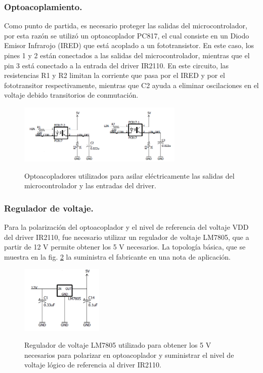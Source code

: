 \subsubsection{Optoacoplamiento.}
Como punto de partida, es necesario proteger las salidas del microcontrolador, por esta razón se utilizó un optoacoplador PC817, el cual consiste en un Diodo Emisor Infrarojo (IRED) que está acoplado a un fototransistor. En este caso, los pines 1 y 2 están conectados a las salidas del microcontrolador, mientras que el pin 3 está conectado a la entrada del driver IR2110. En este circuito, las resistencias R1 y R2 limitan la corriente que pasa por el IRED y por el fototransitor respectivamente, mientras que C2 ayuda a eliminar oscilaciones en el voltaje debido transitorios de conmutación. 
\begin{figure}[h!]
\begin{centering}
    \caption{Optoacopladores utilizados para asilar eléctricamente las salidas del microcontrolador y las entradas del driver.}
    \includegraphics[width=0.7\textwidth]{Images/Optoacoplador.png}
    \label{fig:optoacoplador}
  \par\end{centering}
\end{figure}
\subsubsection{Regulador de voltaje.}
Para la polarización del optoacoplador y el nivel de referencia del voltaje  VDD del driver IR2110, fue necesario utilizar un regulador de voltaje LM7805, que a partir de 12 V permite obtener los 5 V necesarios. La topología básica, que se muestra en la fig.  \ref{fig:Regulador} la suministra el fabricante en una nota  de aplicación. 
\begin{figure}[h!]
\begin{centering}
    \caption{Regulador de voltaje LM7805 utilizado para obtener los 5 V necesarios para polarizar en optoacoplador y suministrar el nivel de voltaje lógico de referencia al driver IR2110.}
    \includegraphics[width=0.35\textwidth]{Images/Regulador.png}
    \label{fig:Regulador}
  \par\end{centering}
\end{figure}
